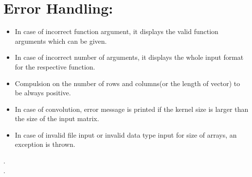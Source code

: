 \documentclass{article}
\begin{document}
\section{Error Handling:}

\begin{itemize}
\tightlist
\item
  In case of incorrect function argument, it displays the valid function
  arguments which can be given.
\item
  In case of incorrect number of arguments, it displays the whole input
  format for the respective function.
\item
  Compulsion on the number of rows and columns(or the length of vector)
  to be always positive.
\item
  In case of convolution, error message is printed if the kernel size is
  larger than the size of the input matrix.
\item
  In case of invalid file input or invalid data type input for size of
  arrays, an exception is thrown.
\end{itemize}


\cite{MKL}.\\
\cite{OpenBLAS}.



\end{document}
